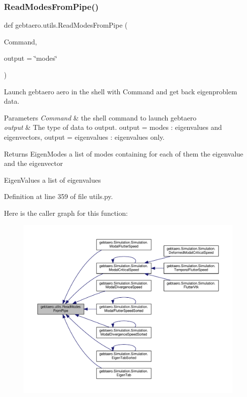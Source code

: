 \subsubsection{\texorpdfstring{Read\+Modes\+From\+Pipe()}{ReadModesFromPipe()}}
{\footnotesize\ttfamily def gebtaero.\+utils.\+Read\+Modes\+From\+Pipe (\begin{DoxyParamCaption}\item[{}]{Command,  }\item[{}]{output = {\ttfamily \char`\"{}modes\char`\"{}} }\end{DoxyParamCaption})}



Launch gebtaero aero in the shell with Command and get back eigenproblem data. 


\begin{DoxyParams}{Parameters}
{\em Command} & the shell command to launch gebtaero \\
\hline
{\em output} & The type of data to output. output = modes \+: eigenvalues and eigenvectors, output = eigenvalues \+: eigenvalues only. \\
\hline
\end{DoxyParams}
\begin{DoxyReturn}{Returns}
Eigen\+Modes a list of modes containing for each of them the eigenvalue and the eigenvector 

Eigen\+Values a list of eigenvalues 
\end{DoxyReturn}


Definition at line 359 of file utils.\+py.

Here is the caller graph for this function\+:
\nopagebreak
\begin{figure}[H]
\begin{center}
\leavevmode
\includegraphics[width=350pt]{namespacegebtaero_1_1utils_a79bf2fa9cdad677abf70cacde7abcf9e_icgraph}
\end{center}
\end{figure}
\mbox{\label{namespacegebtaero_1_1utils_a09e606c50b30d67220853c2340124990}} 
